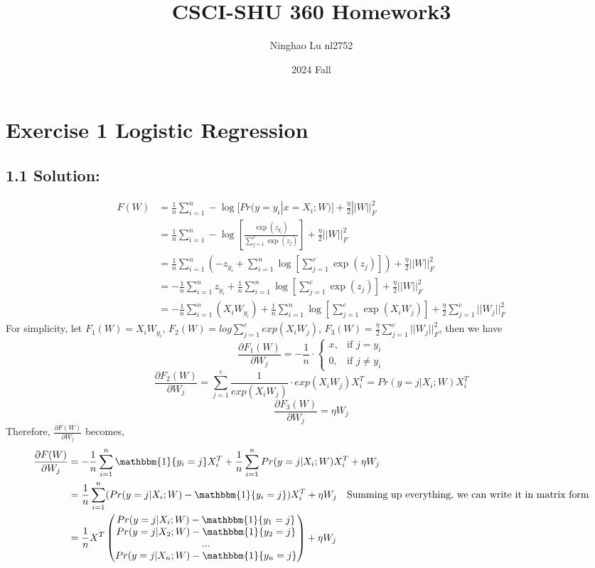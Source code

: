 \documentclass{article}
\title{CSCI-SHU 360 Homework3}
\author{Ninghao Lu nl2752}
\date{2024 Fall}
\begin{document}
\maketitle

\section*{Exercise 1 Logistic Regression}
\subsection*{1.1 Solution:}
\begin{align*}
    F(W)&=\frac{1}{n}\sum_{i=1}^{n}-\log[Pr(y=y_i|x=X_i;W)]+\frac{\eta}{2}||W||_{F}^{2}\\
    &=\frac{1}{n}\sum_{i=1}^{n}-\log[\frac{\exp(z_{y_i})}{\sum_{j=1}^{c}\exp(z_j)}]+\frac{\eta}{2}||W||_{F}^{2}\\
    &=\frac{1}{n}\sum_{i=1}^{n}(-z_{y_i}+\sum_{i=1}^{n}\log[\sum_{j=1}^{c}\exp(z_j)])+\frac{\eta}{2}||W||_{F}^{2}\\
    &=-\frac{1}{n}\sum_{i=1}^{n}z_{y_i}+\frac{1}{n}\sum_{i=1}^{n}\log[\sum_{j=1}^{c}\exp(z_j)]+\frac{\eta}{2}||W||_{F}^{2}\\
    &=-\frac{1}{n}\sum_{i=1}^{n}(X_i W_{y_i})+\frac{1}{n}\sum_{i=1}^{n}\log[\sum_{j=1}^{c}\exp(X_i W_j)]+\frac{\eta}{2}\sum_{j=1}^{c}||W_j||_{F}^{2}
\end{align*}
For simplicity, let $F_1(W) = X_i W_{y_i}$, $F_2(W) = log \sum_{j=1}^{c} exp(X_i W_j)$, $F_3(W) = \frac{\eta}{2} \sum_{j=1}^{c} ||W_j||_F^2$, then we have
\[
\frac{\partial F_1(W)}{\partial W_{j}} = -\frac{1}{n} \cdot \begin{cases} 
    x, & \text{if } j = y_i \\
    0, & \text{if } j \neq y_i 
\end{cases}
\]
\[
\frac{\partial F_2(W)}{\partial W_{j}} = \sum_{j=1}^{c} \frac{1}{exp(X_i W_j)} \cdot exp(X_i W_j) X_i^T = Pr(y = j|X_i;W) X_i^T
\]
\[
\frac{\partial F_3(W)}{\partial W_{j}} = \eta W_j
\]
Therefore, $\frac{\partial F(W)}{\partial W_{j}}$ becomes,
\begin{align*}
    \frac{\partial F(W)}{\partial W_{j}} &= -\frac{1}{n} \sum_{i=1}^{n} \mathbbm{1}\{y_i = j\} X_i^T + \frac{1}{n} \sum_{i=1}^{n} Pr(y=j|X_i;W) X_i^T + \eta W_j\\
                                         &= \frac{1}{n} \sum_{i=1}^{n} (Pr(y=j|X_i;W) - \mathbbm{1}\{y_i = j\}) X_i^T + \eta W_j \quad \text{Summing up everything, we can write it in matrix form}\\
                                         &= \frac{1}{n} X^T \begin{pmatrix}
                                            Pr(y=j|X_i;W) - \mathbbm{1}\{y_1 = j\} \\ Pr(y=j|X_2;W) - \mathbbm{1}\{y_2 = j\} \\ ...\\ Pr(y=j|X_n;W) - \mathbbm{1}\{y_n = j\}
                                         \end{pmatrix} + \eta W_j
\end{align*}
\end{document}
